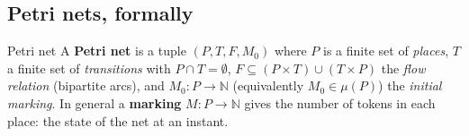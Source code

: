 \subsection{Petri nets, formally}

\begin{definitionbox}{Petri net}
A \textbf{Petri net} is a tuple $(P, T, F, M_0)$ where $P$ is a finite set of \emph{places}, $T$ a finite set of \emph{transitions} with $P \cap T = \emptyset$, $F \subseteq (P \times T) \cup (T \times P)$ the \emph{flow relation} (bipartite arcs), and $M_0 : P \to \mathbb{N}$ (equivalently $M_0 \in \mu(P)$) the \emph{initial marking}. In general a \textbf{marking} $M : P \to \mathbb{N}$ gives the number of tokens in each place: the state of the net at an instant.
\end{definitionbox}

